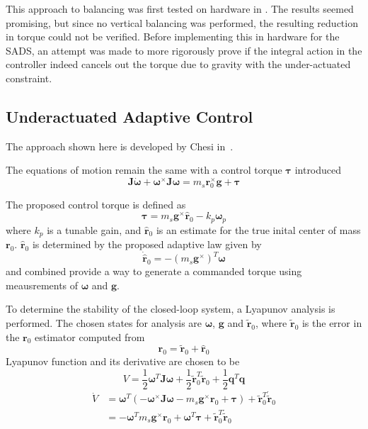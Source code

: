 This approach to balancing was first tested on hardware in \cite{choi_automatic_2016}. The results seemed promising, but since no vertical balancing was performed, the resulting reduction in torque could not be verified. Before implementing this in hardware for the SADS, an attempt was made to more rigorously prove if the integral action in the controller indeed cancels out the torque due to gravity with the under-actuated constraint.  
 
\subsection{Underactuated Adaptive Control}\label{sec:under_adaptive}
The approach shown here is developed by Chesi in~\cite{chesi_automatic_2014}.

The equations of motion remain the same with a control torque $\bm{\tau}$ introduced
\begin{equation} \label{equation:EomWithTau}
    \bm{J}\dot{\bm{\omega}} + \bm{\omega}^\times \bm{J\omega} 
    = m_s\bm{r}_0^{\times}\bm{g} + \bm{\tau}
\end{equation}

The proposed control torque is defined as
\begin{equation}\label{equation:proposed_adaptive}
    \bm{\tau} = m_s\bm{g}^\times\bm{\hat{r}}_0 - k_p\bm{\omega}_p
\end{equation}
where $k_p$ is a tunable gain,  and $\hat{\bm{r}}_0$ is an estimate for the true inital center of mass ${\bm{r}}_0$.  $\hat{\bm{r}}_0$ is determined by the proposed adaptive law given by
\begin{equation} \label{equation:adaptive_law}
    \dot{\hat{\bm{r}}}_0 = -(m_s\bm{g}^{\times})^T\bm{\omega}
\end{equation}
 and  combined provide a way to generate a commanded torque using meausrements of $\bm{\omega}$ and $\bm{g}$. 

To determine the stability of the closed-loop system, a Lyapunov analysis is performed. The chosen states for analysis are $\bm{\omega}$, $\bm{g}$ and $\tilde{\bm{r}}_0$, where $\tilde{\bm{r}}_0$ is the error in the $\bm{r}_0$ estimator computed from
\begin{equation}\label{equation:r_relations}
    \bm{r}_0= \tilde{\bm{r}}_0+\hat{\bm{r}}_0
\end{equation} 
Lyapunov function and its derivative are chosen to be 
\begin{equation}
    {V} = \frac{1}{2}\bm{\omega}^T\bm{J\omega} + \frac{1}{2}\tilde{\bm{r}}_0^T\tilde{\bm{r}}_0 + \frac{1}{2}\bm{q}^T\bm{q}
\end{equation}
\begin{align}
    \dot{V} &= \bm{\omega}^T(-\bm{\omega}^\times \bm{J\omega} 
    -m_s\bm{g}^{\times}\bm{r}_0 + \bm{\tau}) 
    + \tilde{\bm{r}}_0^T\dot{\tilde{\bm{r}}}_0 \\
    &= -\bm{\omega}^Tm_s\bm{g}^{\times}\bm{r}_0+\bm{\omega}^T\bm{\tau}
    + \tilde{\bm{r}}_0^T\dot{\tilde{\bm{r}}}_0
\end{align}

